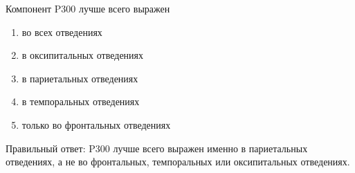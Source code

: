 
Компонент P300 лучше всего выражен

\begin{enumerate}
    \item во всех отведениях
    \item в оксипитальных отведениях
    \item в париетальных отведениях
    \item в темпоральных отведениях
    \item только во фронтальных отведениях
\end{enumerate}

\explanationSection

Правильный ответ: P300 лучше всего выражен именно в париетальных отведениях, а не во фронтальных, темпоральных или оксипитальных отведениях.

